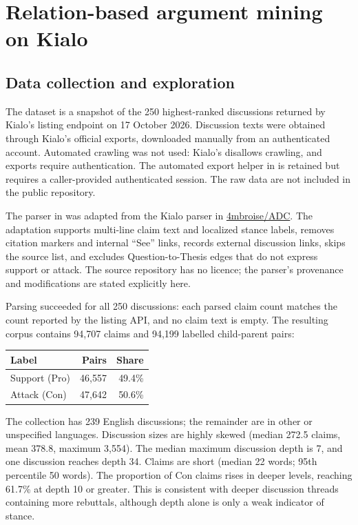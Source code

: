 \documentclass[11pt,a4paper]{article}
\newcommand{\code}[1]{\texttt{\detokenize{#1}}}
\begin{document}
\section{Relation-based argument mining on Kialo}

\subsection{Data collection and exploration}

The dataset is a snapshot of the 250 highest-ranked discussions returned by Kialo's listing endpoint on 17 October 2026. Discussion texts were obtained through Kialo's official exports, downloaded manually from an authenticated account. Automated crawling was not used: Kialo's \code{robots.txt} disallows crawling, and exports require authentication. The automated export helper in \code{part2_kialo.py} is retained but requires a caller-provided authenticated session. The raw data are not included in the public repository.

The parser in \code{part2_kialo.py} was adapted from the Kialo parser in \href{https://github.com/4mbroise/ADC}{4mbroise/ADC}. The adaptation supports multi-line claim text and localized stance labels, removes citation markers and internal ``See'' links, records external discussion links, skips the source list, and excludes Question-to-Thesis edges that do not express support or attack. The source repository has no licence; the parser's provenance and modifications are stated explicitly here.

Parsing succeeded for all 250 discussions: each parsed claim count matches the count reported by the listing API, and no claim text is empty. The resulting corpus contains 94,707 claims and 94,199 labelled child-parent pairs:

\begin{center}
\begin{tabular}{lrr}
\toprule
Label & Pairs & Share \\
\midrule
Support (Pro) & 46,557 & 49.4\% \\
Attack (Con) & 47,642 & 50.6\% \\
\bottomrule
\end{tabular}
\end{center}

The collection has 239 English discussions; the remainder are in other or unspecified languages. Discussion sizes are highly skewed (median 272.5 claims, mean 378.8, maximum 3,554). The median maximum discussion depth is 7, and one discussion reaches depth 34. Claims are short (median 22 words; 95th percentile 50 words). The proportion of Con claims rises in deeper levels, reaching 61.7\% at depth 10 or greater. This is consistent with deeper discussion threads containing more rebuttals, although depth alone is only a weak indicator of stance.
\end{document}
